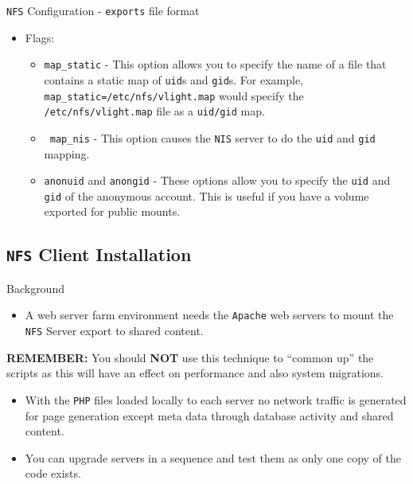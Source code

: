 \documentclass[xcolor=table]{beamer}
\begin{document}
\begin{frame}{\texttt{NFS} Configuration - \texttt{exports} file format}
  \begin{itemize}
    \item Flags:
      \begin{itemize}
        \item \texttt{map\_static} - This option allows you to specify the name of a file that contains a static map of \texttt{uid}s and \texttt{gid}s. For example, \texttt{map\_static=/etc/nfs/vlight.map} would specify the \texttt{/etc/nfs/vlight.map} file as a \texttt{uid/gid} map. 
        \item \texttt{ map\_nis} - This option causes the \texttt{NIS} server to do the \texttt{uid} and \texttt{gid} mapping.
        \item \texttt{anonuid} and \texttt{anongid} - These options allow you to specify the \texttt{uid} and \texttt{gid} of the anonymous account. This is useful if you have a volume exported for public mounts.
      \end{itemize}
  \end{itemize}
\end{frame}

\subsection{\texttt{NFS} Client Installation}
\begin{frame}{Background}
  \begin{itemize}
    \item A web server farm environment needs the \texttt{Apache} web servers to mount the \texttt{NFS} Server export to shared content.
  \end{itemize}
  \begin{tcolorbox}
      \noindent \scriptsize \textbf{REMEMBER:} You should \textbf{NOT} use this technique to ``common up'' the scripts as this will have an effect on performance and also system migrations.
      \begin{itemize}
        \item With the \texttt{PHP} files loaded locally to each server no network traffic is generated for page generation except meta data through database activity and shared content.
        \item You can upgrade servers in a sequence and test them as only one copy of the code exists.
      \end{itemize}
  \end{tcolorbox}
\end{frame}
\end{document}
